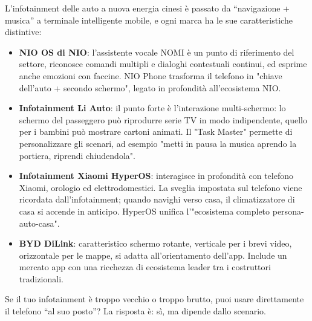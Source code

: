 
L'infotainment delle auto a nuova energia cinesi è passato da “navigazione + musica” a terminale intelligente mobile, e ogni marca ha le sue caratteristiche distintive:

\begin{itemize}
  \item \textbf{NIO OS di NIO}: l'assistente vocale NOMI è un punto di riferimento del settore, riconosce comandi multipli e dialoghi contestuali continui, ed esprime anche emozioni con faccine. NIO Phone trasforma il telefono in "chiave dell'auto + secondo schermo", legato in profondità all'ecosistema NIO.
  \item \textbf{Infotainment Li Auto}: il punto forte è l'interazione multi-schermo: lo schermo del passeggero può riprodurre serie TV in modo indipendente, quello per i bambini può mostrare cartoni animati. Il "Task Master" permette di personalizzare gli scenari, ad esempio "metti in pausa la musica aprendo la portiera, riprendi chiudendola".
  \item \textbf{Infotainment Xiaomi HyperOS}: interagisce in profondità con telefono Xiaomi, orologio ed elettrodomestici. La sveglia impostata sul telefono viene ricordata dall'infotainment; quando navighi verso casa, il climatizzatore di casa si accende in anticipo. HyperOS unifica l'"ecosistema completo persona-auto-casa".
  \item \textbf{BYD DiLink}: caratteristico schermo rotante, verticale per i brevi video, orizzontale per le mappe, si adatta all'orientamento dell'app. Include un mercato app con una ricchezza di ecosistema leader tra i costruttori tradizionali.
\end{itemize}


Se il tuo infotainment è troppo vecchio o troppo brutto, puoi usare direttamente il telefono “al suo posto”? La risposta è: sì, ma dipende dallo scenario.

